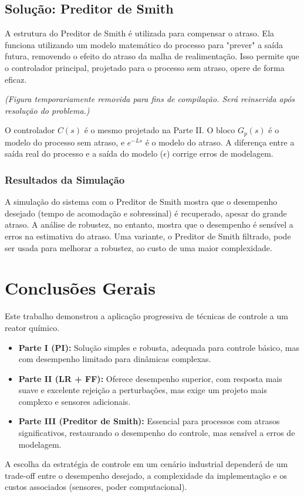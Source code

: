 \documentclass[a4paper,12pt]{report}
\begin{document}
\section{Solução: Preditor de Smith}
A estrutura do Preditor de Smith é utilizada para compensar o atraso. Ela funciona utilizando um modelo matemático do processo para "prever" a saída futura, removendo o efeito do atraso da malha de realimentação. Isso permite que o controlador principal, projetado para o processo sem atraso, opere de forma eficaz.

\textit{(Figura temporariamente removida para fins de compilação. Será reinserida após resolução do problema.)}

O controlador \(C(s)\) é o mesmo projetado na Parte II. O bloco \(G_p(s)\) é o modelo do processo sem atraso, e \(e^{-Ls}\) é o modelo do atraso. A diferença entre a saída real do processo e a saída do modelo (\(\epsilon\)) corrige erros de modelagem.

\subsection{Resultados da Simulação}
A simulação do sistema com o Preditor de Smith mostra que o desempenho desejado (tempo de acomodação e sobressinal) é recuperado, apesar do grande atraso. A análise de robustez, no entanto, mostra que o desempenho é sensível a erros na estimativa do atraso. Uma variante, o Preditor de Smith filtrado, pode ser usada para melhorar a robustez, ao custo de uma maior complexidade.

\chapter{Conclusões Gerais}
Este trabalho demonstrou a aplicação progressiva de técnicas de controle a um reator químico.
\begin{itemize}
    \item \textbf{Parte I (PI):} Solução simples e robusta, adequada para controle básico, mas com desempenho limitado para dinâmicas complexas.
    \item \textbf{Parte II (LR + FF):} Oferece desempenho superior, com resposta mais suave e excelente rejeição a perturbações, mas exige um projeto mais complexo e sensores adicionais.
    \item \textbf{Parte III (Preditor de Smith):} Essencial para processos com atrasos significativos, restaurando o desempenho do controle, mas sensível a erros de modelagem.
\end{itemize}
A escolha da estratégia de controle em um cenário industrial dependerá de um trade-off entre o desempenho desejado, a complexidade da implementação e os custos associados (sensores, poder computacional).
\end{document}
